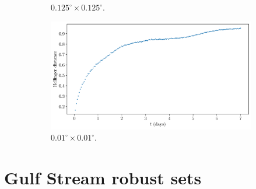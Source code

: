 \begin{figure}
\begin{center}
\begin{subfigure}{0.49\textwidth}
			\caption{\(0.125^\circ \times 0.125^\circ\).}
		\end{subfigure}
		\begin{subfigure}{0.49\textwidth}
			\includegraphics[width=\textwidth]{chp06_applications/figures/gulf_stream/traj_stoch_hell_dist_0.01}
			\caption{\(0.01^\circ \times 0.01^\circ\).}
		\end{subfigure}
		\caption{}
		\label{fig:natl_hell_bwidth}
	\end{center}
\end{figure}




\section{Gulf Stream robust sets}\label{app:s2_robust}


